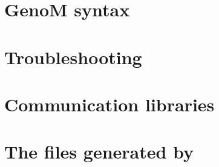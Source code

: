 \documentclass[a4paper,11pt]{book}
\begin{document}
\chapter{GenoM syntax}
\label{cha|syntax}



\appendix

\chapter{Troubleshooting}
\label{anx|troubles}


\chapter{Communication libraries}
\label{anx|posters}


\chapter[The files generated by GenoM]{The files generated by \GenoM}
\label{anx|files}


\end{document}
